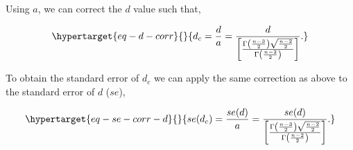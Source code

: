 \documentclass[
  letterpaper,
  DIV=11,
  numbers=noendperiod]{scrreprt}
\begin{document}
Using \(a\), we can correct the \(d\) value such that,

\begin{equation}\protect\hypertarget{eq-d-corr}{}{
d_c = \frac{d}{a} = \frac{d}{ \left[\frac{\Gamma\left(\frac{n-3}{2}\right)\sqrt{\frac{n-2}{2}}}{\Gamma\left(\frac{n-2}{2}\right)}\right]}.
}\label{eq-d-corr}\end{equation}

To obtain the standard error of \(d_c\) we can apply the same correction
as above to the standard error of \(d\) (\(se\)),

\begin{equation}\protect\hypertarget{eq-se-corr-d}{}{
se(d_c) = \frac{se(d)}{a} = \frac{se(d)}{ \left[\frac{\Gamma\left(\frac{n-3}{2}\right)\sqrt{\frac{n-2}{2}}}{\Gamma\left(\frac{n-2}{2}\right)}\right]}.
}\label{eq-se-corr-d}\end{equation}
\end{document}
